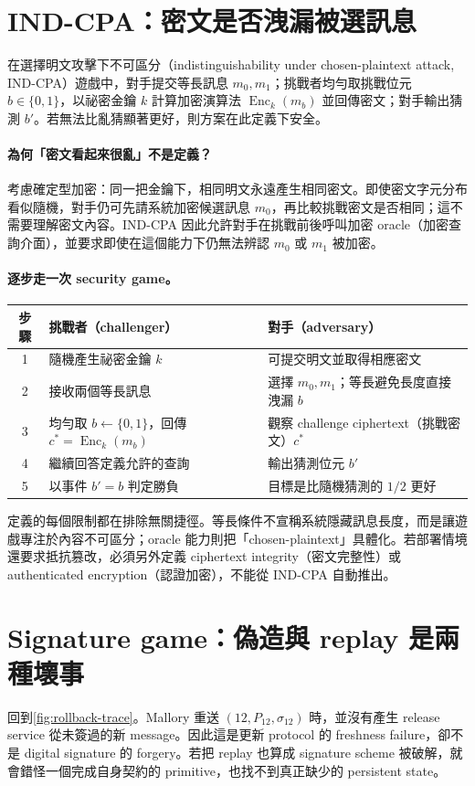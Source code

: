 \documentclass[11pt,a4paper,oneside,openany]{book}
\begin{document}
\section{IND-CPA：密文是否洩漏被選訊息}
在選擇明文攻擊下不可區分（indistinguishability under chosen-plaintext attack, IND-CPA）遊戲中，對手提交等長訊息 $m_0,m_1$；挑戰者均勻取挑戰位元 $b\in\{0,1\}$，以祕密金鑰 $k$ 計算加密演算法 $\operatorname{Enc}_k(m_b)$ 並回傳密文；對手輸出猜測 $b'$。若無法比亂猜顯著更好，則方案在此定義下安全。

\paragraph{為何「密文看起來很亂」不是定義？}
考慮確定型加密：同一把金鑰下，相同明文永遠產生相同密文。即使密文字元分布看似隨機，對手仍可先請系統加密候選訊息 $m_0$，再比較挑戰密文是否相同；這不需要理解密文內容。IND-CPA 因此允許對手在挑戰前後呼叫加密 oracle（加密查詢介面），並要求即使在這個能力下仍無法辨認 $m_0$ 或 $m_1$ 被加密。

\paragraph{逐步走一次 security game。}
\begin{center}
\begin{tabularx}{.94\textwidth}{@{}cYY@{}}
\toprule
步驟 & 挑戰者（challenger） & 對手（adversary） \\
 & 隨機產生祕密金鑰 $k$ & 可提交明文並取得相應密文 \\
2 & 接收兩個等長訊息 & 選擇 $m_0,m_1$；等長避免長度直接洩漏 $b$ \\
3 & 均勻取 $b\leftarrow\{0,1\}$，回傳 $c^*=\operatorname{Enc}_k(m_b)$ & 觀察 challenge ciphertext（挑戰密文）$c^*$ \\
4 & 繼續回答定義允許的查詢 & 輸出猜測位元 $b'$ \\
5 & 以事件 $b'=b$ 判定勝負 & 目標是比隨機猜測的 $1/2$ 更好 \\
\bottomrule
\end{tabularx}
\end{center}
定義的每個限制都在排除無關捷徑。等長條件不宣稱系統隱藏訊息長度，而是讓遊戲專注於內容不可區分；oracle 能力則把「chosen-plaintext」具體化。若部署情境還要求抵抗篡改，必須另外定義 ciphertext integrity（密文完整性）或 authenticated encryption（認證加密），不能從 IND-CPA 自動推出。

\section{Signature game：偽造與 replay 是兩種壞事}
回到\cref{fig:rollback-trace}。Mallory 重送 $(12,P_{12},\sigma_{12})$ 時，並沒有產生 release service 從未簽過的新 message。因此這是更新 protocol 的 freshness failure，卻不是 digital signature 的 forgery。若把 replay 也算成 signature scheme 被破解，就會錯怪一個完成自身契約的 primitive，也找不到真正缺少的 persistent state。
\end{document}
